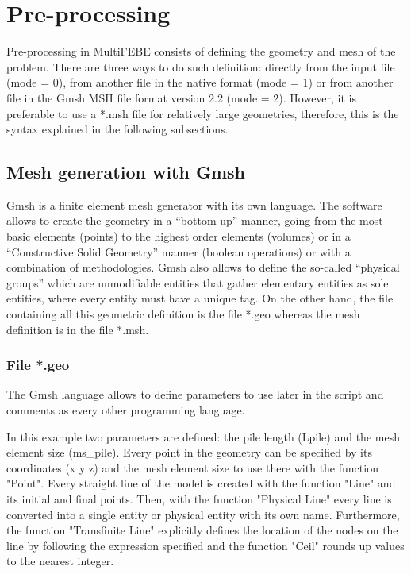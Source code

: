 \documentclass[a4]{article}
\begin{document}
\section{Pre-processing} 
Pre-processing in MultiFEBE consists of defining the geometry and mesh of the problem. There are three ways to do such definition: directly from the input file (mode = 0), from another file in the native format (mode = 1) or from another file in the Gmsh MSH file format version 2.2 (mode = 2). However, it is preferable to use a *.msh file for relatively large geometries, therefore, this is the syntax explained in the following subsections.
   
\subsection{Mesh generation with Gmsh}
Gmsh \cite{gmsh, gmshweb} is a finite element mesh generator with its own language. The software allows to create the geometry in a “bottom-up” manner, going from the most basic elements (points) to the highest order elements (volumes) or in a “Constructive Solid Geometry” manner (boolean operations) or with a combination of methodologies. Gmsh also allows to define  the so-called “physical groups” which are unmodifiable entities that gather elementary entities as sole entities, where every entity must have a unique tag. On the other hand, the file containing all this geometric definition is the file *.geo whereas the mesh definition is in the file *.msh. 

\subsubsection{File *.geo}
The Gmsh language allows to define parameters to use later in the script and comments as every other programming language. 

In this example two parameters are defined: the pile length (Lpile) and the mesh element size (ms\_pile). Every point in the geometry can be specified by its coordinates (x y z) and the mesh element size to use there with the function "Point". Every straight line of the model is created with the function "Line" and its initial and final points. Then, with the function "Physical Line" every line is converted into a single entity or physical entity with its own name. Furthermore, the function "Transfinite Line" explicitly defines the location of the nodes on the line by following the expression specified and the function "Ceil" rounds up values to the nearest integer.
\end{document}
